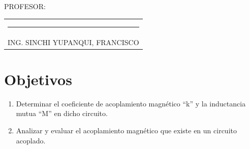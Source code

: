 \documentclass[a4paper,11pt]{report}
\begin{document}
{\large PROFESOR:} \\[2cm]
\begin{center}
\begin{tabular}{c}
\rule[3pt]{4.8in}{1pt}\\[1pt]
ING. SINCHI YUPANQUI, FRANCISCO 
\end{tabular}
\end{center}
\vfill
\newpage
\tableofcontents
\newpage
{} %
\setcounter{page}{1}  %
\chapter{Objetivos}
\begin{enumerate}
\item Determinar el coeficiente de acoplamiento magnético ``k'' y la inductancia mutua ``M'' en dicho circuito.
\item Analizar y evaluar el acoplamiento magnético que existe en un circuito acoplado.
\end{enumerate}
\end{document}
